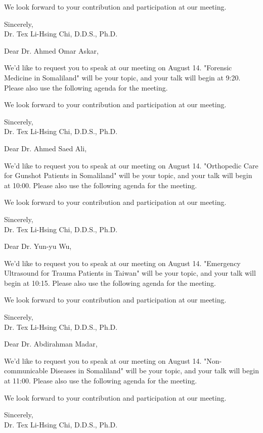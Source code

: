 \documentclass[25pt, a4paper]{letter}
\newcommand{\yourName}{Dr. Tex Li-Hsing Chi, D.D.S., Ph.D.}
\begin{document}
We look forward to your contribution and participation at our meeting.

Sincerely, \\
\yourName


\clearpage
Dear Dr. Ahmed Omar Askar,

We'd like to request you to speak at our meeting on August 14. "Forensic Medicine in Somaliland" will be your topic, and your talk will begin at 9:20. Please also use the following agenda for the meeting.

We look forward to your contribution and participation at our meeting.

Sincerely, \\
\yourName


\clearpage

Dear Dr. Ahmed Saed Ali,

We'd like to request you to speak at our meeting on August 14. "Orthopedic Care for Gunshot Patients in Somaliland" will be your topic, and your talk will begin at 10:00. Please also use the following agenda for the meeting.

We look forward to your contribution and participation at our meeting.

Sincerely, \\
\yourName


\clearpage

Dear Dr. Yun-yu Wu,

We'd like to request you to speak at our meeting on August 14. "Emergency Ultrasound for Trauma Patients in Taiwan" will be your topic, and your talk will begin at 10:15. Please also use the following agenda for the meeting.

We look forward to your contribution and participation at our meeting.

Sincerely, \\
\yourName



\clearpage
Dear Dr. Abdirahman Madar,

We'd like to request you to speak at our meeting on August 14. "Non-communicable Diseases in Somaliland" will be your topic, and your talk will begin at 11:00. Please also use the following agenda for the meeting.

We look forward to your contribution and participation at our meeting.

Sincerely, \\
\yourName


\clearpage
\end{document}
